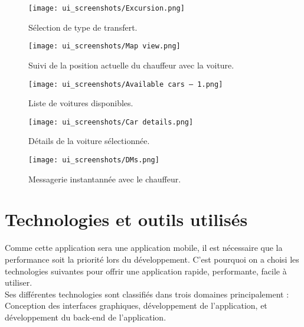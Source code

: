 \clearpage
\begin{multicols}{2}
    \begin{figure}[H]
        \centering
        \texttt{[image: ui\_screenshots/Excursion.png]}
        \vspace{1cm}
        \captionsetup{justification=centering}

        \caption{\centering Sélection de type de transfert.}
        \label{fig:trip_select}
    \end{figure}
    \begin{figure}[H]
        \centering
        \texttt{[image: ui\_screenshots/Map view.png]}
        \vspace{1cm}
        \captionsetup{justification=centering}

        \caption{\centering Suivi de la position actuelle du chauffeur avec la voiture.}
        \label{fig:follow_driver}
    \end{figure}
\end{multicols}
\begin{multicols}{2}
    \begin{figure}[H]
        \centering
        \texttt{[image: ui\_screenshots/Available cars – 1.png]}
        \vspace{1cm}
        \captionsetup{justification=centering}

        \caption{\centering Liste de voitures disponibles.}
        \label{fig:available_cars}
    \end{figure}
    \begin{figure}[H]
        \centering
        \texttt{[image: ui\_screenshots/Car details.png]}
        \vspace{1cm}
        \captionsetup{justification=centering}

        \caption{\centering Détails de la voiture sélectionnée.}
        \label{fig:car_details}
    \end{figure}
\end{multicols}
\vspace{1cm}
\begin{figure}[H]
    \centering
    \texttt{[image: ui\_screenshots/DMs.png]}
    \vspace{1cm}
    \caption{\centering Messagerie instantannée avec le chauffeur.}
    \label{fig:dms}
\end{figure}
\section{Technologies et outils utilisés}
Comme cette application sera une application mobile, il est nécessaire que la performance soit la priorité lors du développement. C'est pourquoi on a choisi les technologies suivantes pour offrir une application rapide, performante, facile à utiliser.\\
\noindent Ses différentes technologies sont classifiés dans trois domaines principalement : Conception des interfaces graphiques, développement de l'application, et développement du back-end de l'application.\\
